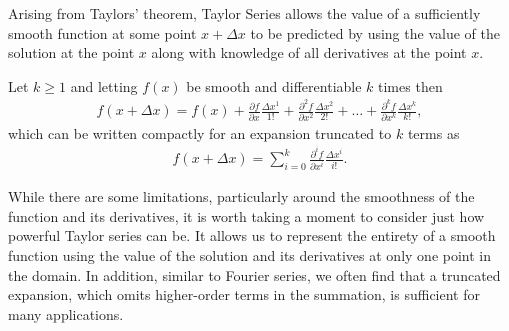 Arising from Taylors' theorem, Taylor Series allows the value of a sufficiently smooth function at some point $x + \Delta x$ to be predicted by using the value of the solution at the point $x$ along with knowledge of all derivatives at the point $x$.
\begin{theorem}
Let $k \geq 1$ and letting $f(x)$ be smooth and differentiable $k$ times then
\begin{align}
f(x + \Delta x) = f(x) + \frac{\partial f}{\partial x}\frac{\Delta x^1}{1!} + \frac{\partial^2 f}{\partial x^2}\frac{\Delta x^2}{2!} + \hdots + \frac{\partial^k f}{\partial x^k}\frac{\Delta x^k}{k!},
\end{align}
which can be written compactly for an expansion truncated to $k$ terms as
\begin{align}
f(x + \Delta x) = \sum_{i=0}^{k} \frac{\partial^i f}{\partial x^i}\frac{\Delta x^i}{i!}.
\end{align}
\end{theorem}
While there are some limitations, particularly around the smoothness of the function and its derivatives, it is worth taking a moment to consider just how powerful Taylor series can be. It allows us to represent the entirety of a smooth function using the value of the solution and its derivatives at only one point in the domain. In addition, similar to Fourier series, we often find that a truncated expansion, which omits higher-order terms in the summation, is sufficient for many applications.

